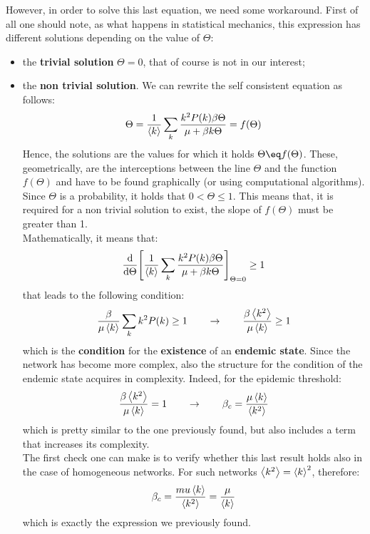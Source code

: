 \documentclass[../main/main.tex]{subfiles}
\begin{document}
However, in order to solve this last equation, we need some workaround. First of all one should note, as what happens in statistical mechanics, this expression has different solutions depending on the value of $\Theta$:
\begin{itemize}
\item the \textbf{trivial solution} \( \Theta =0 \), that of course is not in our interest;
\item the \textbf{non trivial solution}. We can rewrite the self consistent equation as follows:
\begin{equation*}
   \Theta = \frac{1}{\expval{k} } \sum_{k}^{} \frac{k^2 P(k) \beta \Theta }{\mu + \beta k \Theta } = f(\Theta )
\end{equation*}
Hence, the solutions are the values for which it holds \( \Theta  \eq f(\Theta )\). These, geometrically, are the interceptions between the line \( \Theta  \) and the function \( f(\Theta ) \) and have to be found graphically (or using computational algorithms).\\ 
Since \( \Theta  \) is a probability, it holds that \( 0<\Theta \le 1 \). This means that, it is required for a non trivial solution to exist, the slope of \( f(\Theta ) \) must be greater than 1.\\
Mathematically, it means that:
\begin{equation*}
  \dv{}{\Theta }  \qty[ \frac{1}{\expval{k} } \sum_{k}^{} \frac{k^2 P(k) \beta \Theta }{\mu + \beta k \Theta } ]_{\Theta =0} \ge 1
\end{equation*}
that leads to the following condition:
\begin{equation}
\frac{\beta }{\mu \expval{k} } \sum_{k}^{}k^2 P(k) \ge 1 \qquad \rightarrow  \qquad \frac{\beta \expval{k^2} }{\mu \expval{k} } \ge 1
\end{equation}
which is the \textbf{condition} for the \textbf{existence} of an \textbf{endemic state}. Since the network has become more complex, also the structure for the condition of the endemic state acquires in complexity. Indeed, for the epidemic threshold:
\begin{equation}
 \frac{\beta \expval{k^2} }{\mu \expval{k} } = 1 \qquad \rightarrow \qquad \beta _c = \frac{\mu \expval{k} }{\expval{k^2} }
\end{equation}
which is pretty similar to the one previously found, but also includes a term that increases its complexity.\\
The first check one can make is to verify whether this last result holds also in the case of homogeneous networks. For such networks \( \expval{k^2} = \expval{k}^2   \), therefore:
\begin{equation*}
  \beta _c = \frac{mu \expval{k} }{\expval{k^2} } = \frac{\mu }{\expval{k} }
\end{equation*}
which is exactly the expression we previously found.
\end{itemize}
\end{document}
